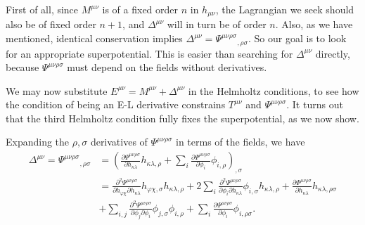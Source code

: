 \documentclass[aps,physrev,preprint,groupedaddress]{revtex4-2}
\begin{document}
First of all, since  \(M^{\mu\nu}\) is of a fixed order \(n\) in \(h_{\mu\nu}\), the Lagrangian we seek should also be of fixed order \(n+1\), and \(\Delta^{\mu\nu}\) will in turn be of order \(n\).  Also, as we have mentioned, identical conservation implies \(\Delta^{\mu\nu}=\Psi^{\mu\nu\rho\sigma}{}_{,\rho\sigma}\). So our goal is to look for an appropriate superpotential. This is easier than searching for \(\Delta^{\mu\nu}\) directly,  because  \(\Psi^{\mu\nu\rho\sigma}\) must depend on the fields without derivatives. 

We may now substitute \(E^{\mu\nu}=M^{\mu\nu}+\Delta^{\mu\nu}\) in the Helmholtz conditions, to see how the condition of being an E-L derivative constrains  \(T^{\mu\nu}\) and \(\Psi^{\mu\nu\rho\sigma}\). It turns out that the third Helmholtz condition fully fixes the superpotential, as we now show.

Expanding the \(\rho,\sigma\) derivatives of \(\Psi^{\mu\nu\rho\sigma}\) in terms of the fields, we have
\begin{equation}\begin{split}\label{Psiexp}\Delta^{\mu\nu}=\Psi^{\mu\nu\rho\sigma}{}_{,\rho\sigma}&={\left(\frac{\partial \Psi^{\mu\nu\rho\sigma}}{\partial h_{\kappa\lambda}}h_{\kappa\lambda,\rho}+\sum_i \frac{\partial \Psi^{\mu\nu\rho\sigma}}{\partial \phi_i}\phi_{i,\rho}\right)}_{,\sigma}\\&=\frac{\partial^2 \Psi^{\mu\nu\rho\sigma}}{\partial h_{\varphi\chi}\partial h_{\kappa\lambda}}h_{\varphi\chi,\sigma}h_{\kappa\lambda,\rho}+2\sum_i\frac{\partial^2 \Psi^{\mu\nu\rho\sigma}}{\partial \phi_i\partial h_{\kappa\lambda}}\phi_{i,\sigma}h_{\kappa\lambda,\rho}+\frac{\partial \Psi^{\mu\nu\rho\sigma}}{\partial h_{\kappa\lambda}}h_{\kappa\lambda,\rho\sigma}\\
&+\sum_{i,j}\frac{\partial^2 \Psi^{\mu\nu\rho\sigma}}{\partial \phi_j\partial \phi_i}\phi_{j,\sigma}\phi_{i,\rho}+\sum_i\frac{\partial \Psi^{\mu\nu\rho\sigma}}{\partial \phi_i} \phi_{i,\rho\sigma}
.\end{split}\end{equation}
\end{document}
